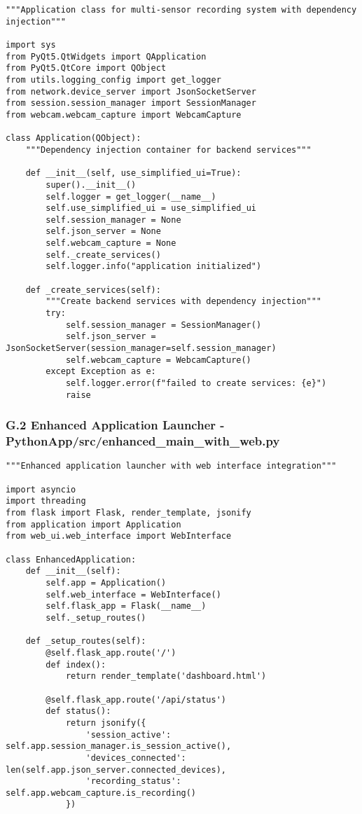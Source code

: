 \documentclass[12pt,a4paper]{article}
\begin{document}
\begin{verbatim}
"""Application class for multi-sensor recording system with dependency injection"""

import sys
from PyQt5.QtWidgets import QApplication
from PyQt5.QtCore import QObject
from utils.logging_config import get_logger
from network.device_server import JsonSocketServer
from session.session_manager import SessionManager
from webcam.webcam_capture import WebcamCapture

class Application(QObject):
    """Dependency injection container for backend services"""
    
    def __init__(self, use_simplified_ui=True):
        super().__init__()
        self.logger = get_logger(__name__)
        self.use_simplified_ui = use_simplified_ui
        self.session_manager = None
        self.json_server = None
        self.webcam_capture = None
        self._create_services()
        self.logger.info("application initialized")
    
    def _create_services(self):
        """Create backend services with dependency injection"""
        try:
            self.session_manager = SessionManager()
            self.json_server = JsonSocketServer(session_manager=self.session_manager)
            self.webcam_capture = WebcamCapture()
        except Exception as e:
            self.logger.error(f"failed to create services: {e}")
            raise
\end{verbatim}

\subsubsection{G.2 Enhanced Application Launcher - PythonApp/src/enhanced_main_with_web.py}

\begin{verbatim}
"""Enhanced application launcher with web interface integration"""

import asyncio
import threading
from flask import Flask, render_template, jsonify
from application import Application
from web_ui.web_interface import WebInterface

class EnhancedApplication:
    def __init__(self):
        self.app = Application()
        self.web_interface = WebInterface()
        self.flask_app = Flask(__name__)
        self._setup_routes()
    
    def _setup_routes(self):
        @self.flask_app.route('/')
        def index():
            return render_template('dashboard.html')
        
        @self.flask_app.route('/api/status')
        def status():
            return jsonify({
                'session_active': self.app.session_manager.is_session_active(),
                'devices_connected': len(self.app.json_server.connected_devices),
                'recording_status': self.app.webcam_capture.is_recording()
            })
\end{verbatim}
\end{document}
